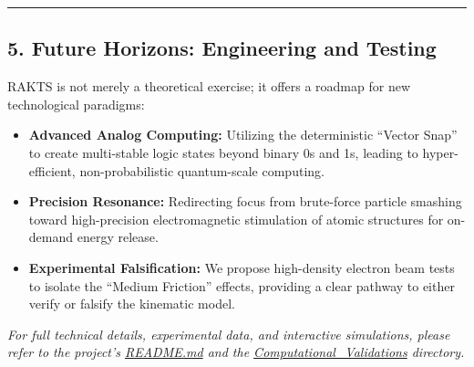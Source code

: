 \documentclass[twocolumn]{article}
\providecommand{\tightlist}{%
  \setlength{\itemsep}{0pt}\setlength{\parskip}{0pt}}
\begin{document}
\begin{center}\rule{0.5\linewidth}{0.5pt}\end{center}

\subsection{5. Future Horizons: Engineering and
Testing}\label{future-horizons-engineering-and-testing}

RAKTS is not merely a theoretical exercise; it offers a roadmap for new
technological paradigms:

\begin{itemize}
\tightlist
\item
  \textbf{Advanced Analog Computing:} Utilizing the deterministic
  ``Vector Snap'' to create multi-stable logic states beyond binary 0s
  and 1s, leading to hyper-efficient, non-probabilistic quantum-scale
  computing.
\item
  \textbf{Precision Resonance:} Redirecting focus from brute-force
  particle smashing toward high-precision electromagnetic stimulation of
  atomic structures for on-demand energy release.
\item
  \textbf{Experimental Falsification:} We propose high-density electron
  beam tests to isolate the ``Medium Friction'' effects, providing a
  clear pathway to either verify or falsify the kinematic model.
\end{itemize}

\emph{For full technical details, experimental data, and interactive
simulations, please refer to the project's
\href{../README.md}{README.md} and the
\href{./Computational_Validations/}{Computational\_Validations}
directory.}
\end{document}

